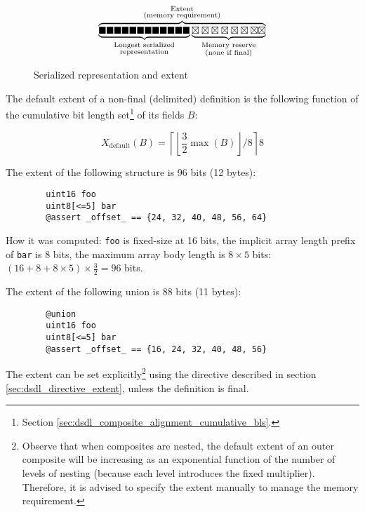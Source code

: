 \begin{figure}[H]
    $$
    \overbrace{%
        \underbrace{%
            \blacksquare\blacksquare\blacksquare\blacksquare\blacksquare\blacksquare%
            \blacksquare\blacksquare\blacksquare\blacksquare\blacksquare\blacksquare%
        }_{\substack{\text{Longest serialized} \\ \text{representation}}}%
        \underbrace{%
            \boxtimes\boxtimes\boxtimes\boxtimes\boxtimes\boxtimes\boxtimes\boxtimes%
        }_{\substack{\text{Memory reserve} \\ \text{(none if final)}}}%
    }^{\substack{%
        \text{Extent} \\
        \text{(memory requirement)}
    }}
    $$
    \caption{Serialized representation and extent\label{fig:dsdl_extent}}
\end{figure}

The default extent of a non-final (delimited) definition is the following function
of the cumulative bit length set\footnote{Section \ref{sec:dsdl_composite_alignment_cumulative_bls}.}
of its fields $B$:

$$
X_\text{default}\left(B\right) =
\left\lceil{}\left\lfloor{}\frac{3}{2} \max{}\left(B\right)\right\rfloor{}/8\right\rceil{}8
$$

\begin{remark}
    The extent of the following structure is 96 bits (12 bytes):
    \begin{verbatim}
        uint16 foo
        uint8[<=5] bar
        @assert _offset_ == {24, 32, 40, 48, 56, 64}
    \end{verbatim}
    How it was computed: \verb|foo| is fixed-size at 16 bits,
    the implicit array length prefix of \verb|bar| is 8 bits,
    the maximum array body length is $8 \times 5$ bits:
    $(16 + 8 + 8 \times 5) \times \frac{3}{2} = 96$ bits.

    The extent of the following union is 88 bits (11 bytes):
    \begin{verbatim}
        @union
        uint16 foo
        uint8[<=5] bar
        @assert _offset_ == {16, 24, 32, 40, 48, 56}
    \end{verbatim}
\end{remark}

The extent can be set explicitly\footnote{
    Observe that when composites are nested,
    the default extent of an outer composite will be increasing as an exponential
    function of the number of levels of nesting (because each level introduces the fixed multiplier).
    Therefore, it is advised to specify the extent manually to manage the memory requirement.
}
using the directive described in section \ref{sec:dsdl_directive_extent},
unless the definition is final.

